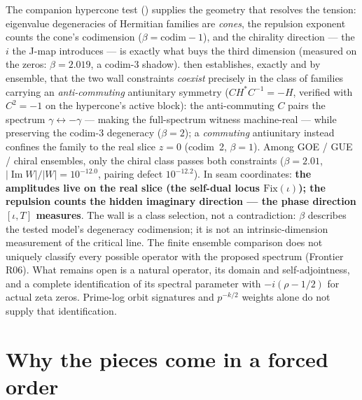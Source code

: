 \documentclass[11pt]{article}
\theoremstyle{definition}
\theoremstyle{plain}
\begin{document}
The companion hypercone test
()
supplies the geometry that resolves the
tension: eigenvalue degeneracies of Hermitian families are \emph{cones}, the repulsion exponent
counts the cone's codimension ($\beta = \mathrm{codim} - 1$), and the chirality direction --- the
$i$ the J-map introduces --- is exactly what buys the third dimension (measured on the zeros:
$\beta = 2.019$, a codim-3 shadow).  then establishes,
exactly and by ensemble, that the two wall constraints \emph{coexist} precisely in the class of
families carrying an \emph{anti-commuting} antiunitary symmetry ($C H^{*} C^{-1} = -H$, verified
with $C^2=-1$ on the hypercone's active block): the anti-commuting $C$ pairs the spectrum
$\gamma\leftrightarrow-\gamma$ --- making the full-spectrum witness machine-real --- while
preserving the codim-3 degeneracy ($\beta=2$); a \emph{commuting} antiunitary instead confines the
family to the real slice $z=0$ (codim~2, $\beta=1$). Among GOE / GUE / chiral ensembles, only the
chiral class passes both constraints ($\beta=2.01$, $|\!\operatorname{Im}W|/|W| = 10^{-12.0}$,
pairing defect $10^{-12.2}$). In seam coordinates: \textbf{the amplitudes live on the real slice
(the self-dual locus $\mathrm{Fix}(\iota)$); the repulsion counts the hidden imaginary direction
--- the phase direction $[\iota,T]$ measures}. The wall is a class selection, not a contradiction:
$\beta$ describes the tested model's degeneracy codimension; it is not an
intrinsic-dimension measurement of the critical line. The finite ensemble
comparison does not uniquely classify every possible operator with the
proposed spectrum (Frontier R06). What remains open is a natural operator,
its domain and self-adjointness, and a complete identification of its spectral
parameter with $-i(\rho-1/2)$ for actual zeta zeros. Prime-log orbit signatures
and $p^{-k/2}$ weights alone do not supply that identification.

\section{Why the pieces come in a forced order}\label{sec:assembly}
\end{document}
